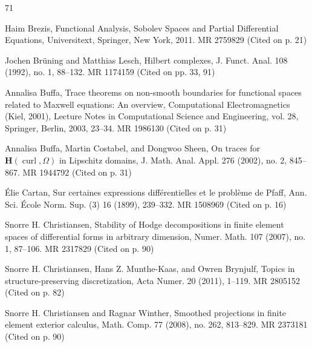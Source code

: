 \begin{MBSourceBibliography}{71}
\item\label{bib:source-23}Haim Brezis, Functional Analysis, Sobolev Spaces and Partial Differential Equations, Universitext, Springer, New York, 2011. MR 2759829 (Cited on p. 21)

\item\label{bib:source-24}Jochen Brüning and Matthias Lesch, Hilbert complexes, J. Funct. Anal. 108 (1992), no. 1, 88–132. MR 1174159 (Cited on pp. 33, 91)

\item\label{bib:source-25}Annalisa Buffa, Trace theorems on non-smooth boundaries for functional spaces related to Maxwell equations: An overview, Computational Electromagnetics (Kiel, 2001), Lecture Notes in Computational Science and Engineering, vol. 28, Springer, Berlin, 2003, 23–34. MR 1986130 (Cited on p. 31)

\item\label{bib:source-26}Annalisa Buffa, Martin Costabel, and Dongwoo Sheen, On traces for $\mathbf H(\operatorname{curl},\Omega)$ in Lipschitz domains, J. Math. Anal. Appl. 276 (2002), no. 2, 845–867. MR 1944792 (Cited on p. 31)

\item\label{bib:source-27}\label{bib:cartan-differential-expressions}Élie Cartan, Sur certaines expressions différentielles et le problème de Pfaff, Ann. Sci. École Norm. Sup. (3) 16 (1899), 239–332. MR 1508969 (Cited on p. 16)

\item\label{bib:source-28}Snorre H. Christiansen, Stability of Hodge decompositions in finite element spaces of differential forms in arbitrary dimension, Numer. Math. 107 (2007), no. 1, 87–106. MR 2317829 (Cited on p. 90)

\item\label{bib:source-29}Snorre H. Christiansen, Hans Z. Munthe-Kaas, and Owren Brynjulf, \newline Topics in structure-preserving discretization, Acta Numer. 20 (2011), 1–119. MR 2805152 (Cited on p. 82)

\item\label{bib:source-30}Snorre H. Christiansen and Ragnar Winther, Smoothed projections in finite element exterior calculus, Math. Comp. 77 (2008), no. 262, 813–829. MR 2373181 (Cited on p. 90)


\end{MBSourceBibliography}
